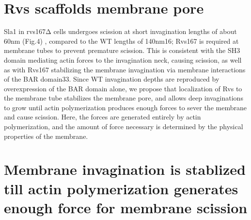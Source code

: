 \section{Rvs scaffolds membrane pore}
Sla1 in rvs167Δ cells undergoes scission at short invagination lengths of about 60nm (Fig.4) , compared to the WT lengths of 140nm16; Rvs167 is required at membrane tubes to prevent premature scission. This is consistent with the SH3 domain mediating actin forces to the invagination neck, causing scission, as well as with Rvs167 stabilizing the membrane invagination via membrane interactions of the BAR domain33. Since WT invagination depths are reproduced by overexpression of the BAR domain alone, we propose that localization of Rvs to the membrane tube stabilizes the membrane pore, and allows deep invaginations to grow until actin polymerization produces enough forces to sever the membrane and cause scission. Here, the forces are generated entirely by actin polymerization, and the amount of force necessary is determined by the physical properties of the membrane.

\section{  Membrane invagination is stablized till actin polymerization generates enough force for membrane scission}

\newpage

